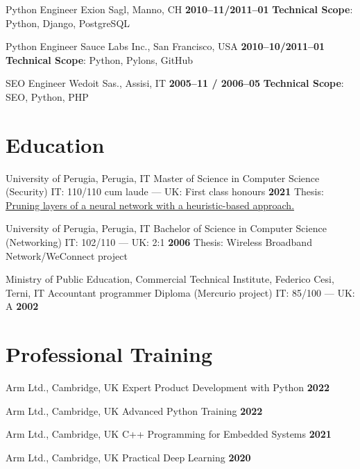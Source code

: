 \documentclass[10pt,a4paper,sans]{moderncv}
\begin{document}
    {Python Engineer}
    {Exion Sagl, Manno, CH}
    {\textbf{2010--11/2011--01}}
    {\textbf{Technical Scope}: Python, Django, PostgreSQL}
    {}

    {Python Engineer}
    {Sauce Labs Inc., San Francisco, USA}
    {\textbf{2010--10/2011--01}}
    {\textbf{Technical Scope}: Python, Pylons, GitHub}
    {}

    {SEO Engineer}
    {Wedoit Sas., Assisi, IT}
    {\textbf{2005--11 / 2006--05}}
    {\textbf{Technical Scope}: SEO, Python, PHP}
    {}

\section{Education}

\cventry{}
    {University of Perugia, Perugia, IT}
    {Master of Science in Computer Science (Security) IT\@: 110/110 cum laude
        --- UK\@: First class honours}
    {\textbf{2021}}
    {}
    {Thesis: \href{https://github.com/diegorusso/master-degree-thesis}{Pruning
        layers of a neural network with a heuristic-based approach.}}

\cventry{}
    {University of Perugia, Perugia, IT}
    {Bachelor of Science in Computer Science (Networking) IT\@: 102/110 ---
        UK\@: 2:1}
    {\textbf{2006}}
    {}
    {Thesis: Wireless Broadband Network/WeConnect project}

\cventry{}
    {Ministry of Public Education, Commercial Technical Institute, Federico
        Cesi, Terni, IT}
    {Accountant programmer Diploma (Mercurio project) IT\@: 85/100 --- UK\@: A}
    {\textbf{2002}}
    {}
    {}

\section{Professional Training}

    {Arm Ltd., Cambridge, UK}
    {Expert Product Development with Python}
    {\textbf{2022}}
    {}
    {}

    {Arm Ltd., Cambridge, UK}
    {Advanced Python Training}
    {\textbf{2022}}
    {}
    {}

    {Arm Ltd., Cambridge, UK}
    {C++ Programming for Embedded Systems}
    {\textbf{2021}}
    {}
    {}

    {Arm Ltd., Cambridge, UK}
    {Practical Deep Learning}
    {\textbf{2020}}
    {}
    {}
\end{document}
